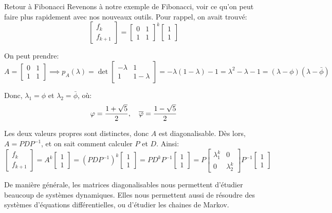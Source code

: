 \documentclass[a4paper]{article}
\begin{document}
\begin{parag}{Retour à Fibonacci}
    Revenons à notre exemple de Fibonacci, voir ce qu'on peut faire plus rapidement avec nos nouveaux outils. Pour rappel, on avait trouvé:
    \[\begin{bmatrix} f_k \\ f_{k+1} \end{bmatrix} = \begin{bmatrix} 0 & 1 \\ 1 & 1 \end{bmatrix}^{k} \begin{bmatrix} 1 \\ 1 \end{bmatrix} \]

    On peut prendre:
    \[A = \begin{bmatrix} 0 & 1 \\ 1 & 1 \end{bmatrix} \implies p_A\left(\lambda\right) = \det\begin{bmatrix} -\lambda & 1 \\ 1 & 1-\lambda \end{bmatrix} = -\lambda\left(1 - \lambda\right) - 1 = \lambda^2 - \lambda - 1 = \left(\lambda - \phi\right)\left(\lambda - \bar{\phi}\right)\]

    Donc, $\lambda_1 = \phi$ et $\lambda_2 = \bar{\phi}$, où:
    \[\varphi = \frac{1 + \sqrt{5}}{2}, \quad \overline{\varphi} = \frac{1 - \sqrt{5}}{2}\]

    Les deux valeurs propres sont distinctes, donc $A$ est diagonalisable. Dès lors, $A = PDP^{-1}$, et on sait comment calculer $P$ et $D$. Ainsi:
    \[\begin{bmatrix} f_{k} \\ f_{k+1} \end{bmatrix} = A^k \begin{bmatrix} 1 \\ 1 \end{bmatrix} = \left(PDP^{-1}\right)^k \begin{bmatrix} 1 \\ 1 \end{bmatrix} = PD^k P^{-1} \begin{bmatrix} 1 \\ 1 \end{bmatrix} = P\begin{bmatrix} \lambda_1^k & 0 \\ 0 & \lambda_2^k \end{bmatrix} P^{-1} \begin{bmatrix} 1 \\ 1 \end{bmatrix} \]

    De manière générale, les matrices diagonalisables nous permettent d'étudier beaucoup de systèmes dynamiques. Elles nous permettent aussi de résoudre des systèmes d'équations différentielles, ou d'étudier les chaines de Markov.
\end{parag}
\end{document}
